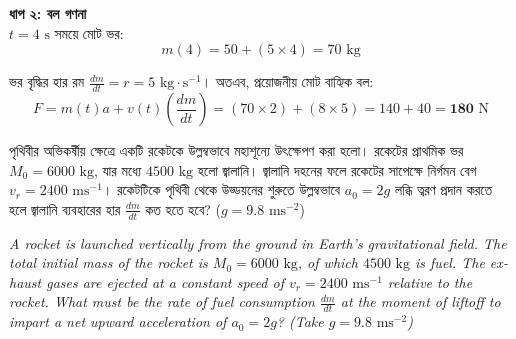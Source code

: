 \documentclass[12pt, a4paper]{article}
\begin{document}
{{\begin{tcolorbox}[solutionbox={সমাধান (Solution)}]
    \vspace{0.5em}
    \noindent\textbf{ধাপ ২: বল গণনা} \\
    $t = 4\text{ s}$ সময়ে মোট ভর:
    \[ m(4) = 50 + (5 \times 4) = 70\text{ kg} \]
    
    ভর বৃদ্ধির হার রম $\frac{dm}{dt} = r = 5\text{ kg}\cdot\text{s}^{-1}$। অতএব, প্রয়োজনীয় মোট বাহ্যিক বল:
    \[ F = m(t) a + v(t) \left(\frac{dm}{dt}\right) = (70 \times 2) + (8 \times 5) = 140 + 40 = \mathbf{180}\text{ N} \]
\end{tcolorbox}

\newpage

\begin{tcolorbox}[questionbox={প্রশ্ন (Question) 39}]
    \noindent
    পৃথিবীর অভিকর্ষীয় ক্ষেত্রে একটি রকেটকে উল্লম্বভাবে মহাশূন্যে উৎক্ষেপণ করা হলো। রকেটের প্রাথমিক ভর $M_0 = 6000\text{ kg}$, যার মধ্যে $4500\text{ kg}$ হলো জ্বালানি। জ্বালানি দহনের ফলে রকেটের সাপেক্ষে নির্গমন বেগ $v_r = 2400\text{ ms}^{-1}$। রকেটটিকে পৃথিবী থেকে উড্ডয়নের শুরুতে উল্লম্বভাবে $a_0 = 2g$ লব্ধি ত্বরণ প্রদান করতে হলে জ্বালানি ব্যবহারের হার $\frac{dm}{dt}$ কত হতে হবে? ($g = 9.8\text{ ms}^{-2}$)
    
    \vspace{0.8em}
    \begin{english}
    \noindent\textit{\color{darkgray}
    A rocket is launched vertically from the ground in Earth's gravitational field. The total initial mass of the rocket is $M_0 = 6000\text{ kg}$, of which $4500\text{ kg}$ is fuel. The exhaust gases are ejected at a constant speed of $v_r = 2400\text{ ms}^{-1}$ relative to the rocket. What must be the rate of fuel consumption $\frac{dm}{dt}$ at the moment of liftoff to impart a net upward acceleration of $a_0 = 2g$? (Take $g = 9.8\text{ ms}^{-2}$)
    }
    \end{english}
\end{tcolorbox}

\vspace{1em}
\begin{center}
\end{center}}}
\end{document}
